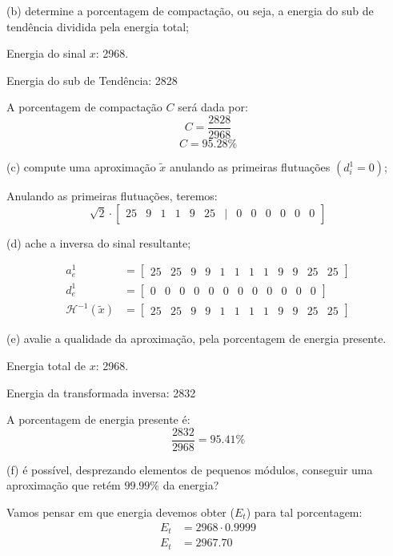 \documentclass[10pt]{article}
\newcommand{\Hi}[1]{\mathcal{H}^{-1}\left(#1\right)}
\begin{document}
\vspace{1em}

(b) determine a porcentagem de compactação, ou seja, a energia do sub de tendência dividida pela energia total;

Energia do sinal $x$: 2968.

Energia do sub de Tendência: 2828

A porcentagem de compactação $C$ será dada por:
\[C = \frac{2828}{2968}\]
\[\boxed{C = 95.28\%}\]

(c) compute uma aproximação $\tilde{x}$ anulando as primeiras flutuações $(d_i^1 = 0)$;

Anulando as primeiras flutuações, teremos:
\[\sqrt{2} \cdot \begin{bmatrix}
    25 & 9 & 1 & 1 & 9 & 25 & \mid & 0 & 0 & 0 & 0 & 0 & 0
\end{bmatrix}\]

(d) ache a inversa do sinal resultante;

\begin{align*}
    a_e^1 &= \begin{bmatrix}
        25 & 25 & 9 & 9 & 1 & 1 & 1 & 1 & 9 & 9 & 25 & 25
    \end{bmatrix}\\
    d_e^1 &= \begin{bmatrix}
        0 & 0 & 0 & 0 & 0 & 0 & 0 & 0 & 0 & 0 & 0 & 0
    \end{bmatrix}\\
    \Hi{\tilde{x}} &= \begin{bmatrix}
        25 & 25 & 9 & 9 & 1 & 1 & 1 & 1 & 9 & 9 & 25 & 25
    \end{bmatrix}
\end{align*}

(e) avalie a qualidade da aproximação, pela porcentagem de energia presente.

Energia total de $x$: 2968.

Energia da transformada inversa: 2832

A porcentagem de energia presente é:
\[\frac{2832}{2968} = \boxed{95.41\%}\]

(f) é possível, desprezando elementos de pequenos módulos, conseguir uma aproximação que retém $99.99\%$ da energia?

Vamos pensar em que energia devemos obter ($E_t$) para tal porcentagem:
\begin{align*}
    E_t &= 2968 \cdot 0.9999\\
    E_t &= 2967.70
\end{align*}
\end{document}
